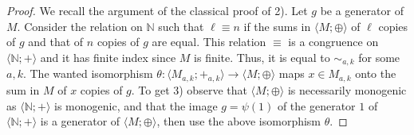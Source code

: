 \documentclass[11pt,a4paper]{article}
\newtheorem{lemma}[theorem]{Lemma}
\theoremstyle{definition} %
\newcommand\+[1]{\mathcal{#1}} %
\newcommand{\N}{{\mathbb N}}     %
\newcommand{\pat}{\color{red}}
\begin{document}
\begin{proof}
We recall the argument of the classical proof of 2).
Let $g$ be a generator of $M$.
Consider the relation on $\N$ such that $\ell\equiv n$ if
the sums in $\langle M;\oplus\rangle$ 
of $\ell$ copies of $g$ and that of $n$ copies of $g$ are equal.
This relation $\equiv$ is a congruence on $\langle\N;+\rangle$ and it has finite index
since $M$ is finite.
Thus, it is equal to $\sim_{a,k}$ for some $a,k$.
The wanted isomorphism $\theta : \langle M_{a,k};+_{a,k}\rangle \to \langle M;\oplus\rangle$
maps $x\in M_{a,k}$ onto the sum in $M$ of $x$ copies of $g$.
To get 3) observe   that $\langle M;\oplus\rangle$ is necessarily monogenic as  $\langle\N;+\rangle$ is monogenic, and that the image $g=\psi(1)$ of the generator $1$ of $\langle\N;+\rangle$
is a generator of $\langle M;\oplus\rangle$,  then use the above isomorphism $\theta$.
\end{proof}
\fi
%
\end{document}
